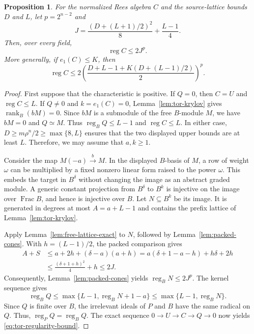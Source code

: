 \documentclass[12pt]{amsart}
\numberwithin{equation}{section}
\newtheorem{proposition}[theorem]{Proposition}
\theoremstyle{definition}
\theoremstyle{remark}
\numberwithin{equation}{section}
\DeclareMathOperator{\reg}{reg}
\DeclareMathOperator{\Frac}{Frac}
\begin{document}
\begin{proposition}\label{prop:tor-bound}
	For the normalized Rees algebra $C$ and the source-lattice bounds $D$ and $L$,
let $p=2^{n-2}$ and
	\[
	J=\frac{(D+(L+1)/2)^2}{8}+\frac{L-1}{4}.
	\]
	Then, over every field,
	\begin{equation}\label{eq:tor-regularity-bound}
		\reg C\le2J^p.
	\end{equation}
	More generally, if $e_1(C)\le K$, then
	\begin{equation}\label{eq:tor-conditional-bound}
		\reg C\le2\left(
		\frac{D+L-1+K(D+(L-1)/2)}2\right)^p.
	\end{equation}
\end{proposition}
\begin{proof}
 First suppose that the characteristic is positive. If $Q=0$, then $C=U$ and $\reg C\le L$. If $Q\ne0$ and $k=e_1(C)=0$, Lemma~\ref{lem:tor-krylov} gives $\operatorname{rank}_B(bM)=0$. Since $bM$ is a submodule of the free $B$-module $M$, we have $bM=0$ and $Q\simeq M$. Thus $\reg_B Q\le L-1$ and $\reg C\le L$. In either case, $D\ge m\rho^n/2\ge\max\{8,L\}$ ensures that the two displayed upper bounds are at least $L$.
Therefore, we may assume that $a,k\ge1$.

Consider the map $M(-a)\xrightarrow{b}M$. In the displayed $B$-basis of $M$, a row of weight $\omega$ can be
multiplied by a fixed nonzero linear form raised to the power $\omega$. This embeds the target in $B^\delta$ without changing the image as an
	abstract graded module. A generic constant projection from $B^\delta$ to $B^k$ is injective on the image over
	$\Frac B$, and hence is injective over $B$.
	Let $N\subseteq B^k$ be its image.
	It is generated in degrees at most $A=a+L-1$ and contains the
	prefix lattice of Lemma~\ref{lem:tor-krylov}.
	
	Apply Lemma~\ref{lem:free-lattice-exact} to $N$, followed by Lemma~\ref{lem:packed-cones}. With $h=(L-1)/2$, the packed comparison
	gives
	\[
	\begin{aligned} A+S&\le a+2h+(\delta-a)(a+h)=a(\delta+1-a-h)+h\delta+2h\\
		&\le\frac{(\delta+1+h)^2}{4}+h\le2J.
	\end{aligned}
	\]
	Consequently,  Lemma~\ref{lem:packed-cones} yields  $\reg_B N\le2J^p$. The kernel sequence gives
	\[
	\reg_B Q\le\max\{L-1,\reg_B N+1-a\}
	\le\max\{L-1,\reg_BN\}.
	\]
	Since $Q$ is finite over $B$, the irrelevant ideals of $P$ and $B$
	have the same radical on $Q$. Thus,
	$\reg_PQ=\reg_BQ$.
	The exact sequence $0\to U\to C\to Q\to0$ now yields
	\eqref{eq:tor-regularity-bound}.
	

\end{proof}
\end{document}
